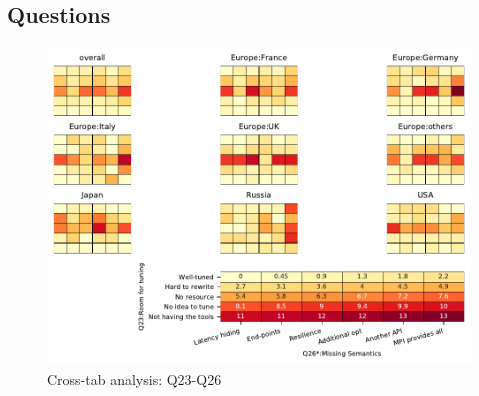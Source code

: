 
\subsection{Questions}


\begin{figure}
\begin{center}
\includegraphics[width=12cm]{../pdfs/Q23-Q26.pdf}
\caption{Cross-tab analysis: Q23-Q26}
\label{fig:Q23-Q26}
\end{center}
\end{figure}

